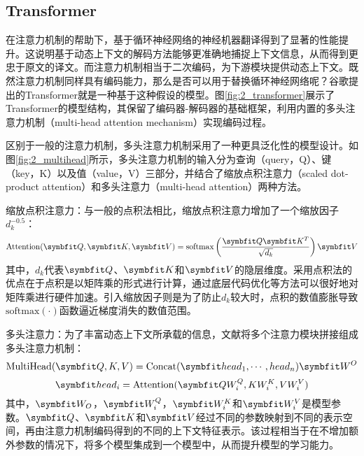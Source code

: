\subsection{Transformer}
\label{sec:2_transformer}

在注意力机制的帮助下，基于循环神经网络的神经机器翻译得到了显著的性能提升。这说明基于动态上下文的解码方法能够更准确地捕捉上下文信息，从而得到更忠于原文的译文。而注意力机制相当于二次编码，为下游模块提供动态上下文。既然注意力机制同样具有编码能力，那么是否可以用于替换循环神经网络呢？谷歌提出的Transformer\cite{5_DBLP:journals/corr/VaswaniSPUJGKP17}就是一种基于这种假设的模型。图\ref{fig:2_transformer}展示了Transformer的模型结构，其保留了编码器-解码器的基础框架，利用内置的多头注意力机制（multi-head attention mechanism）实现编码过程。



区别于一般的注意力机制，多头注意力机制采用了一种更具泛化性的模型设计。如图\ref{fig:2_multihead}所示，多头注意力机制的输入分为查询（query，Q）、键（key，K）以及值（value，V）三部分，并结合了缩放点积注意力（scaled dot-product attention）和多头注意力（multi-head attention）两种方法。

{\sffamily 缩放点积注意力：}与一般的点积法相比，缩放点积注意力增加了一个缩放因子$d_k^{-0.5}$：
\begin{equation}
    \mathrm{Attention}(\Vector{Q},\Vector{K},\Vector{V}) = \mathrm{softmax} \left( \frac{\Vector{Q}\Vector{K}^T}{\sqrt{d_k}} \right) \Vector{V}
\end{equation}
其中，$d_k$代表$\Vector{Q}$、$\Vector{K}$和$\Vector{V}$的隐层维度。采用点积法的优点在于点积是以矩阵乘的形式进行计算，通过底层代码优化等方法可以很好地对矩阵乘进行硬件加速。引入缩放因子则是为了防止$d_k$较大时，点积的数值膨胀导致$\mathrm{softmax}(\cdot)$函数逼近梯度消失的数值范围。

{\sffamily 多头注意力：}为了丰富动态上下文所承载的信息，文献\cite{5_DBLP:journals/corr/VaswaniSPUJGKP17}将多个注意力模块拼接组成多头注意力机制：
\begin{equation}
    \mathrm{MultiHead}(\Vector{Q,K,V}) = \mathrm{Concat}(\Vector{head_1, \cdots, head_n})\Vector{W^O}
\end{equation}
\begin{equation}
    \Vector{head_i} = \mathrm{Attention}(\Vector{Q W_i^Q,K W_i^K,V W_i^V})
\end{equation}
其中，$\Vector{W_O}$，$\Vector{W_i^Q}$，$\Vector{W_i^K}$和$\Vector{W_i^V}$是模型参数。$\Vector{Q}$、$\Vector{K}$和$\Vector{V}$经过不同的参数映射到不同的表示空间，再由注意力机制编码得到的不同的上下文特征表示。该过程相当于在不增加额外参数的情况下，将多个模型集成到一个模型中，从而提升模型的学习能力。

